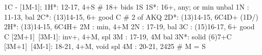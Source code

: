 1C - [1M-1];
1H*: 12-17, 4+S  # 18+ bids 1S
1S*: 16+, any; or min unbal
1N : 11-13, bal
2C*: (13)14-15, 6+ good C  # 2 of AKQ
2D*: (13)14-15, 6C4D+
(1D/) 2H*: (13)14-15, 6C4H+ 
2M : min, 4+M
2N : 17-19, bal
3C : (15)16-17, 6+ good C 
[2M+1]~[3M-1]: inv+, 4+M, spl
3M : 17-19, 4M bal
3N*: solid (6)7+C
[3M+1]~[4M-1]: 18-21, 4+M, void spl
4M : 20-21, 2425
# M = S
